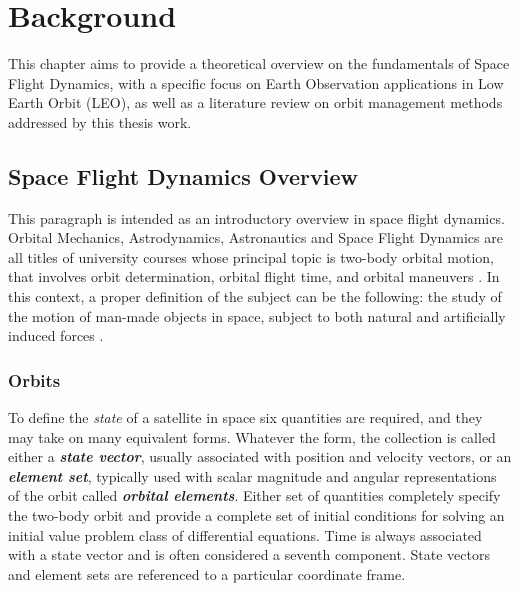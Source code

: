 \chapter{Background}

This chapter aims to provide a theoretical overview on the fundamentals of Space Flight Dynamics, with a specific focus on Earth Observation applications in Low Earth Orbit (LEO), as well as a literature review on orbit management methods addressed by this thesis work.

\section{Space Flight Dynamics Overview}

This paragraph is intended as an introductory overview in space flight dynamics. 
Orbital Mechanics, Astrodynamics, Astronautics and Space Flight Dynamics are all titles of university courses whose principal topic is two-body orbital motion, that involves orbit determination, orbital flight time, and orbital maneuvers
\cite{kluever2018space}.
In this context, a proper definition of the subject can be the following: the study of the motion of man-made objects in space, subject to both natural and artificially induced forces
\cite{griffin2004space}.

\subsection{Orbits}

To define the \textit{state} of a satellite in space six quantities are required, and they may take on many equivalent forms.
Whatever the form, the collection is called either a \textit{\textbf{state vector}}, usually associated with position and velocity vectors, or an \textit{\textbf{element set}}, typically used with scalar magnitude and angular representations of the orbit called \textit{\textbf{orbital elements}}.
Either set of quantities completely specify the two-body orbit and provide a complete set of initial conditions for solving an initial value problem class of differential equations. 
Time is always associated with a state vector and is often considered a seventh component.
State vectors and element sets are referenced to a particular coordinate frame.
\cite{vallado2013fundamentals} 


